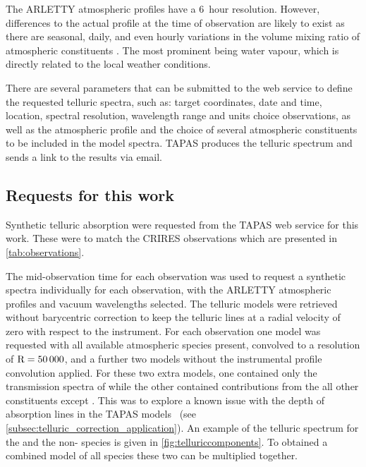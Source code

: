 The {ARLETTY} atmospheric profiles have a 6~hour resolution.
However, differences to the actual profile at the time of observation are likely to exist as there are seasonal, daily, and even hourly variations in the volume mixing ratio of atmospheric constituents \citep[e.g.][]{ramanathan_daily_1953, thoning_atmospheric_1989, schneising_three_2009}.
The most prominent being water vapour, which is directly related to the local weather conditions.

There are several parameters that can be submitted to the web service to define the requested telluric spectra, such as: target coordinates, date and time, location, spectral resolution, wavelength range and units choice observations, as well as the atmospheric profile and the choice of several atmospheric constituents to be included in the model spectra.
{TAPAS} produces the telluric spectrum and sends a link to the results via email.


\subsection{Requests for this work}
Synthetic telluric absorption were requested from the {TAPAS} web service for this work.
These were to match the {CRIRES} observations which are presented in \cref{tab:observations}.

The mid-observation time for each observation was used to request a synthetic spectra individually for each observation, with the {ARLETTY} atmospheric profiles and vacuum wavelengths selected.
The telluric models were retrieved without barycentric correction to keep the telluric lines at a radial velocity of zero with respect to the instrument.
For each observation one model was requested with all available atmospheric species present, convolved to a resolution of \(\rm R=50\,000\), and a further two models without the instrumental profile convolution applied.
For these two extra models, one contained only the transmission spectra of  while the other contained contributions from the all other constituents except .
This was to explore a known issue with the depth of  absorption lines in the {TAPAS} models~\citep{bertaux_tapas_2014} (see \cref{subsec:telluric_correction_application}).
An example of the telluric spectrum for the  and the non- species is given in \cref{fig:telluriccomponents}.
To obtained a combined model of all species these two can be multiplied together.

